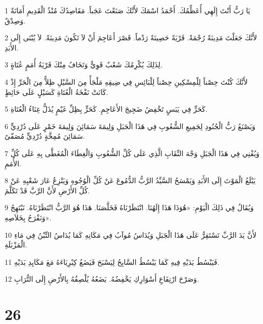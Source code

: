 \par 1 يَا رَبُّ أَنْتَ إِلَهِي أُعَظِّمُكَ. أَحْمَدُ اسْمَكَ لأَنَّكَ صَنَعْتَ عَجَباً. مَقَاصِدُكَ مُنْذُ الْقَدِيمِ أَمَانَةٌ وَصِدْقٌ.
\par 2 لأَنَّكَ جَعَلْتَ مَدِينَةً رُجْمَةً. قَرْيَةً حَصِينَةً رَدْماً. قَصْرَ أَعَاجِمَ أَنْ لاَ تَكُونَ مَدِينَةً. لاَ يُبْنَى إِلَى الأَبَدِ.
\par 3 لِذَلِكَ يُكْرِمُكَ شَعْبٌ قَوِيٌّ وَتَخَافُ مِنْكَ قَرْيَةُ أُمَمٍ عُتَاةٍ.
\par 4 لأَنَّكَ كُنْتَ حِصْناً لِلْمِسْكِينِ حِصْناً لِلْبَائِسِ فِي ضِيقِهِ مَلْجَأً مِنَ السَّيْلِ ظِلاًّ مِنَ الْحَرِّ إِذْ كَانَتْ نَفْخَةُ الْعُتَاةِ كَسَيْلٍ عَلَى حَائِطٍ.
\par 5 كَحَرٍّ فِي يَبَسٍ تَخْفِضُ ضَجِيجَ الأَعَاجِمِ. كَحَرٍّ بِظِلِّ غَيْمٍ يُذَلُّ غِنَاءُ الْعُتَاةِ.
\par 6 وَيَصْنَعُ رَبُّ الْجُنُودِ لِجَمِيعِ الشُّعُوبِ فِي هَذَا الْجَبَلِ وَلِيمَةَ سَمَائِنَ وَلِيمَةَ خَمْرٍ عَلَى دُرْدِيٍّ سَمَائِنَ مُمِخَّةٍ دُرْدِيٍّ مُصَفّىً.
\par 7 وَيُفْنِي فِي هَذَا الْجَبَلِ وَجْهَ النِّقَابِ الَّذِي عَلَى كُلِّ الشُّعُوبِ وَالْغِطَاءَ الْمُغَطَّى بِهِ عَلَى كُلِّ الأُمَمِ.
\par 8 يَبْلَعُ الْمَوْتَ إِلَى الأَبَدِ وَيَمْسَحُ السَّيِّدُ الرَّبُّ الدُّمُوعَ عَنْ كُلِّ الْوُجُوهِ وَيَنْزِعُ عَارَ شَعْبِهِ عَنْ كُلِّ الأَرْضِ لأَنَّ الرَّبَّ قَدْ تَكَلَّمَ.
\par 9 وَيُقَالُ فِي ذَلِكَ الْيَوْمِ: «هُوَذَا هَذَا إِلَهُنَا. انْتَظَرْنَاهُ فَخَلَّصَنَا. هَذَا هُوَ الرَّبُّ انْتَظَرْنَاهُ. نَبْتَهِجُ وَنَفْرَحُ بِخَلاَصِهِ».
\par 10 لأَنَّ يَدَ الرَّبِّ تَسْتَقِرُّ عَلَى هَذَا الْجَبَلِ وَيُدَاسُ مُوآبُ فِي مَكَانِهِ كَمَا يُدَاسُ التِّبْنُ فِي مَاءِ الْمَزْبَلَةِ.
\par 11 فَيَبْسُطُ يَدَيْهِ فِيهِ كَمَا يَبْسُطُ السَّابِحُ لِيَسْبَحَ فَيَضَعُ كِبْرِيَاءَهُ مَعَ مَكَايِدِ يَدَيْهِ.
\par 12 وَصَرْحَ ارْتِفَاعِ أَسْوَارِكِ يَخْفِضُهُ. يَضَعُهُ يُلْصِقُهُ بِالأَرْضِ إِلَى التُّرَابِ.

\chapter{26}

